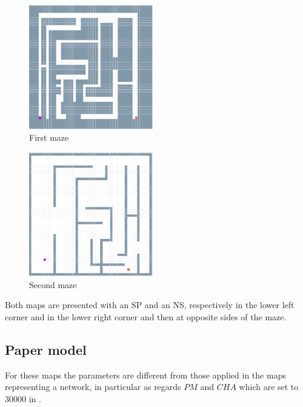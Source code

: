 \begin{figure}[H]
  \centering
    \includegraphics[width=0.48\textwidth]{maze_gpgpu_exp/1_maze_gpgpu}%
    
  \caption{First maze}
  \label{fig:maze_gpgpu_exp/1_maze_gpgpu}
\end{figure}

\begin{figure}[H]
  \centering
    \includegraphics[width=0.48\textwidth]{generic_maze_exp/1_generic_maze}%
    
  \caption{Second maze}
  \label{fig:generic_maze_exp/1_generic_maze}
\end{figure}

Both maps are presented with an SP and an NS, respectively in the lower left corner and in the lower right corner and then at opposite sides of the maze.

\subsection{Paper model}
\label{paper_model}

For these maps the parameters are different from those applied in the maps representing a network, in particular as regards $PM$ and $CHA$ which are set to 30000 in \cite{dourvas2016gpgpu}.

